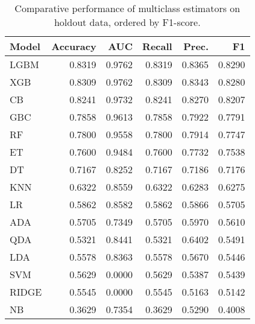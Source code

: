 \begin{table}
\caption{Comparative performance of multiclass estimators on holdout data, ordered by F1-score.}
\label{tbl:multiclass_ho_res_top_models_df}
\begin{tabular}{lrrrrr}
\toprule
Model & Accuracy & AUC & Recall & Prec. & F1 \\
\midrule
LGBM & 0.8319 & 0.9762 & 0.8319 & 0.8365 & 0.8290 \\
XGB & 0.8309 & 0.9762 & 0.8309 & 0.8343 & 0.8280 \\
CB & 0.8241 & 0.9732 & 0.8241 & 0.8270 & 0.8207 \\
GBC & 0.7858 & 0.9613 & 0.7858 & 0.7922 & 0.7791 \\
RF & 0.7800 & 0.9558 & 0.7800 & 0.7914 & 0.7747 \\
ET & 0.7600 & 0.9484 & 0.7600 & 0.7732 & 0.7538 \\
DT & 0.7167 & 0.8252 & 0.7167 & 0.7186 & 0.7176 \\
KNN & 0.6322 & 0.8559 & 0.6322 & 0.6283 & 0.6275 \\
LR & 0.5862 & 0.8582 & 0.5862 & 0.5866 & 0.5705 \\
ADA & 0.5705 & 0.7349 & 0.5705 & 0.5970 & 0.5610 \\
QDA & 0.5321 & 0.8441 & 0.5321 & 0.6402 & 0.5491 \\
LDA & 0.5578 & 0.8363 & 0.5578 & 0.5670 & 0.5446 \\
SVM & 0.5629 & 0.0000 & 0.5629 & 0.5387 & 0.5439 \\
RIDGE & 0.5545 & 0.0000 & 0.5545 & 0.5163 & 0.5142 \\
NB & 0.3629 & 0.7354 & 0.3629 & 0.5290 & 0.4008 \\
\bottomrule
\end{tabular}
\end{table}

